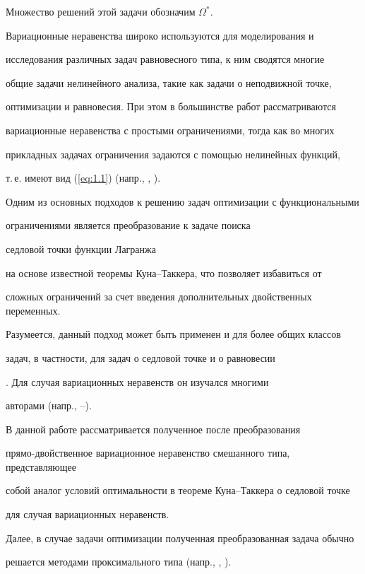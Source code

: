 Множество решений этой задачи обозначим $\Omega^*$.





Вариационные неравенства широко используются для моделирования и 


исследования различных задач равновесного типа, к ним сводятся многие 


общие задачи нелинейного анализа, такие как задачи о неподвижной точке, 


оптимизации и равновесия. При этом в большинстве работ рассматриваются 


вариационные неравенства с простыми ограничениями, тогда как во многих 


прикладных задачах ограничения задаются с помощью нелинейных функций, 


т.\,е. имеют вид (\ref{eq:1.1}) (напр., \cite{ET79}, \cite{GT89}). 


Одним из основных подходов к решению задач оптимизации с функциональными 


ограничениями является преобразование к задаче поиска 


седловой точки функции Лагранжа 


на основе известной теоремы Куна--Таккера, что позволяет избавиться от 


сложных ограничений за счет введения дополнительных двойственных переменных.


Разумеется, данный подход может быть применен и для более общих классов 


задач, в частности, для задач о седловой точке \cite{Ger71} и о равновесии 


\cite{Ant97}. Для случая вариационных неравенств он изучался многими 


авторами (напр., \cite{HP90}--\cite{Pat99}). 





В данной работе рассматривается полученное после преобразования 


прямо-двойственное вариационное неравенство смешанного типа, представляющее


собой аналог условий оптимальности в теореме Куна--Таккера о седловой точке 


для случая вариационных неравенств.


Далее, в случае задачи оптимизации полученная преобразованная задача обычно


решается методами проксимального типа (напр., \cite{GT89}, \cite{Ant97}).


